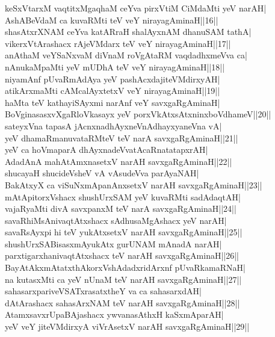\documentclass{article}
\begin{document}
keSxVtarxM vaqtitxMgaqhaM ceYva pirxVtiM CiMdaMti yeV narAH|\\
AshABeVdaM ca kuvaRMti teV veY nirayagAminaH||16||\\
shasAtxrXNAM ceYva katARraH shalAyxnAM dhanuSAM tathA|\\
vikerxVtArashacx rAjeVMdarx teV veY nirayagAminaH||17||\\
anAthaM veYSaNxvaM diVnaM roVgAtaRM vaqdadhxmeVva ca|\\
nAnukaMpaMti yeV mUDhA teV veY nirayagAminaH||18||\\
niyamAnf pUvaRmAdAya yeV pashAcxdajiteVMdirxyAH|\\
atikArxmaMti cAMcalAyxtetxV veY nirayagAminaH||19||\\
haMta teV kathayiSAyxmi narAnf veY savxgaRgAminaH|\\
BoVginasasxvXgaRloVkasayx yeV porxVkAtxsAtxninxboVdhameV||20||\\
sateyxVna tapasA jAcnxnadhAyxneVnAdhayxyaneVna vA|\\
yeV dhamaRmanuvataRMteV teV narA savxgaRgAminaH||21||\\
yeV ca hoVmaparA dhAyxnadeVvatAcaRnatatapxrAH|\\
AdadAnA mahAtAmxnasetxV narAH savxgaRgAminaH||22||\\
shucayaH shucideVsheV vA vAsudeVva parAyaNAH|\\
BakAtxyX ca viSuNxmApanAnxsetxV narAH savxgaRgAminaH||23||\\
mAtApitorxVshacx shushUrxSAM yeV kuvaRMti sadAdaqtAH|\\
vajaRyaMti divA savxpanxM teV narA savxgaRgAminaH||24||\\
savaRhiMsAnivaqtAtxshacx sAdhusaMgAshacx yeV narAH|\\
savaRsAyxpi hi teV yukAtxsetxV narAH savxgaRgAminaH||25||\\
shushUrxSABisasxmAyukAtx gurUNAM mAnadA narAH|\\
parxtigarxhanivaqtAtxshacx teV narAH savxgaRgAminaH||26||\\
BayAtAkxmAtatxthAkorxVshAdadxridArxnf pUvaRkamaRNaH|\\
na kutasxMti ca yeV nUnaM teV narAH savxgaRgAminaH||27||\\
sahasarxpariveVSATxrasatxtheY va ca sahasarxdAH|\\
dAtArashacx sahasArxNAM teV narAH savxgaRgAminaH||28||\\
AtamxsavxrUpaBAjashacx ywvanasAthxH kaSxmAparAH|\\
yeV veY jiteVMdirxyA viVrAsetxV narAH savxgaRgAminaH||29||\\
\end{document}
